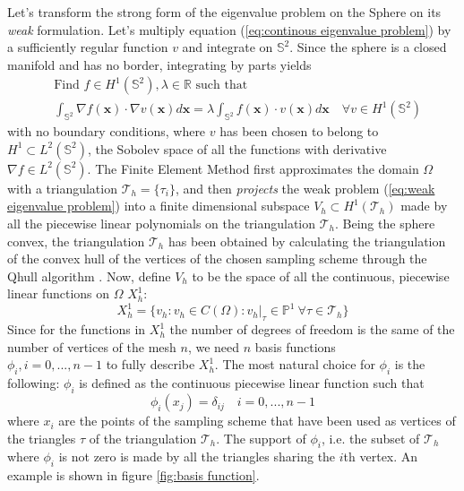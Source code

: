 Let's transform the strong form of the eigenvalue problem on the Sphere on its \textit{weak} formulation. Let's multiply equation (\ref{eq:continous eigenvalue problem}) by a sufficiently regular function $v$ and integrate on $\mathbb S^2$. Since the sphere is a closed manifold and has no border, integrating by parts yields
\begin{equation}\label{eq:weak eigenvalue problem}
\begin{split}
&\text{Find } f\in H^1(\mathbb S^2), \lambda\in\mathbb R\text{ such that }\\ 
&\int_{\mathbb S^2} \nabla f(\mathbf x)\cdot\nabla v(\mathbf x) d\mathbf x = \lambda \int_{\mathbb S^2} f(\mathbf x)\cdot v(\mathbf x)d\mathbf x\quad \forall v\in H^1(\mathbb S^2)
\end{split}
\end{equation}
with no boundary conditions, where $v$ has been chosen to belong to \\$H^1\subset L^2(\mathbb S^2)$, the Sobolev space of all the functions with derivative \\$\nabla f\in L^2(\mathbb S^2)$. The Finite Element Method first approximates the domain $\Omega$ with a triangulation $\mathcal T_h=\{ \tau_i \}$, and then \textit{projects} the weak problem (\ref{eq:weak eigenvalue problem}) into a finite dimensional subspace $V_h\subset H^1(\mathcal T_h)$ made by all the piecewise linear polynomials on the triangulation $\mathcal T_h$. Being the sphere convex, the triangulation $\mathcal T_h$ has been obtained by calculating the triangulation of the convex hull of the vertices of the chosen sampling scheme through the Qhull algorithm \cite{Barber96thequickhull}. Now, define $V_h$ to be the space of all the continuous, piecewise linear functions on $\Omega$ $X_h^1$:
$$X_h^{1}=\{v_h: v_h\in C(\Omega): \left.v_h\right|_{\tau}\in\mathbb P^1\  \forall \tau\in \mathcal T_h\}$$ 
Since for the functions in $X_h^1$ the number of degrees of freedom is the same of the number of vertices of the mesh $n$, we need  $n$ basis functions \\$\phi_i, i=0,...,n-1$ to fully describe $X_h^{1}$. The most natural choice for $\phi_i$ is the following: $\phi_i$ is defined as the continuous piecewise linear function such that 
$$
\phi_i(x_j) = \delta_{ij}\quad i=0,...,n-1
$$
where $x_i$ are the points of the sampling scheme that have been used as vertices of the triangles $\tau$ of the triangulation $\mathcal T_h$. The support of $\phi_i$, i.e. the subset of $\mathcal T_h$ where $\phi_i$ is not zero is made by all the triangles sharing the $i$th vertex. An example is shown in figure \ref{fig:basis function}.

